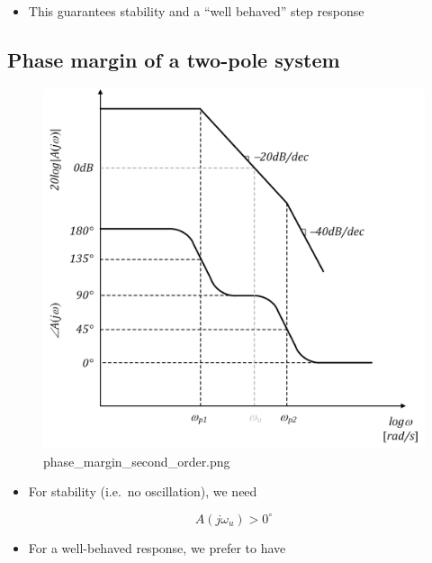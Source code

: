 \documentclass[11pt]{article}
\providecommand{\tightlist}{%
      \setlength{\itemsep}{0pt}\setlength{\parskip}{0pt}}
\begin{document}
\begin{itemize}
\tightlist
\item
  This guarantees stability and a ``well behaved'' step response
\end{itemize}

    \hypertarget{phase-margin-of-a-two-pole-system}{%
\subsection{Phase margin of a two-pole
system}\label{phase-margin-of-a-two-pole-system}}

    \begin{figure}
\centering
\includegraphics{phase_margin_second_order.png}
\caption{phase\_margin\_second\_order.png}
\end{figure}

    \begin{itemize}
\tightlist
\item
  For stability (i.e.~no oscillation), we need
\end{itemize}

\begin{equation}
A(j\omega_u) > 0^{\circ}
\end{equation}

\begin{itemize}
\tightlist
\item
  For a well-behaved response, we prefer to have
\end{itemize}
\end{document}
